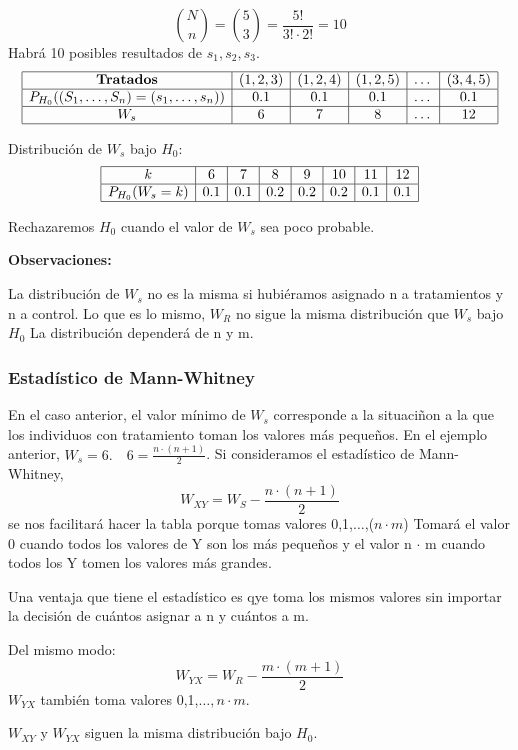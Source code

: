 \[
\binom{N}{n}=\binom{5}{3}=\frac{5!}{3!\cdot2!}=10
\]
Habrá 10 posibles resultados de $s_1,s_2,s_3$.
\[
\begin{array}{|c|c|c|c|c|c|}
\hline
\textbf{Tratados} & (1,2,3) & (1,2,4) & (1,2,5) & \dots & (3,4,5) \\ \hline
P_{H_0}((S_1, \dots, S_n) = (s_1, \dots, s_n)) & 0.1 & 0.1 & 0.1 & \dots & 0.1 \\ \hline
W_s & 6 &7 &8 & \dots &12 \\ \hline
\end{array}
\]

Distribución de \(W_s\) bajo \(H_0\):
\[
\begin{array}{|c|c|c|c|c|c|c|c|}
\hline
k & 6 & 7 & 8 & 9 & 10 & 11 & 12 \\ \hline
P_{H_0}(W_s = k) & 0.1 & 0.1 & 0.2 & 0.2 & 0.2 & 0.1 & 0.1 \\ \hline
\end{array}
\]

Rechazaremos $H_0$ cuando el valor de $W_s$ sea poco probable.

\textbf{Observaciones:}

La distribución de $W_s$ no es la misma si hubiéramos asignado n a tratamientos y n a control. Lo que es lo mismo, $W_R$ no sigue la misma distribución que $W_s$ bajo $H_0$
La distribución dependerá de n y m.

\subsubsection{Estadístico de Mann-Whitney}
En el caso anterior, el valor mínimo de $W_s$ corresponde a la situaciñon a la que los individuos con tratamiento toman los valores más pequeños.
En el ejemplo anterior, $W_s=6. \quad 6=\frac{n \cdot (n+1)}{2}$.
Si consideramos el estadístico de Mann-Whitney,
\[
W_{XY}=W_S- \frac{n \cdot (n+1)}{2}
\]
se nos facilitará hacer la tabla porque tomas valores 0,1,$\dots$,($n \cdot m$)
Tomará el valor 0 cuando todos los valores de Y son los más pequeños y el valor n $\cdot$ m  cuando todos los Y tomen los valores más grandes.

Una ventaja que tiene el estadístico es qye toma los mismos valores sin importar la decisión de cuántos asignar a n y cuántos a m.

Del mismo modo:
\[
W_{YX}=W_R- \frac{m \cdot (m+1)}{2}
\]
$W_{YX}$ también toma valores 0,1,$\dots,n \cdot m$.

$W_{XY}$ y $W_{YX}$ siguen la misma distribución bajo $H_0$.

